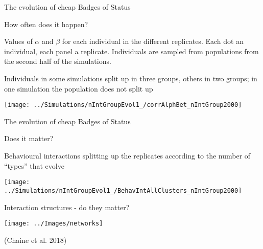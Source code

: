 \documentclass[
  ignorenonframetext,
]{beamer}
\begin{document}
\begin{frame}{The evolution of cheap Badges of Status}
\protect\hypertarget{the-evolution-of-cheap-badges-of-status-3}{}

\begin{block}{How often does it happen?}

\tiny

Values of \(\alpha\) and \(\beta\) for each individual in the different
replicates. Each dot an individual, each panel a replicate. Individuals
are sampled from populations from the second half of the simulations.

Individuals in some simulations split up in three groups, others in two
groups; in one simulation the population does not split up

\begin{flushleft}\texttt{[image: ../Simulations/nIntGroupEvol1\_/corrAlphBet\_nIntGroup2000]} \end{flushleft}

\end{block}

\end{frame}

\begin{frame}{The evolution of cheap Badges of Status}
\protect\hypertarget{the-evolution-of-cheap-badges-of-status-4}{}

\begin{block}{Does it matter?}

\small

Behavioural interactions splitting up the replicates according to the
number of ``types'' that evolve

\begin{flushleft}\texttt{[image: ../Simulations/nIntGroupEvol1\_/BehavIntAllClusters\_nIntGroup2000]} \end{flushleft}

\end{block}

\end{frame}

\begin{frame}{Interaction structures - do they matter?}
\protect\hypertarget{interaction-structures---do-they-matter}{}

\begin{center}\texttt{[image: ../Images/networks]} \end{center}

(Chaine et al. 2018)

\end{frame}
\end{document}
